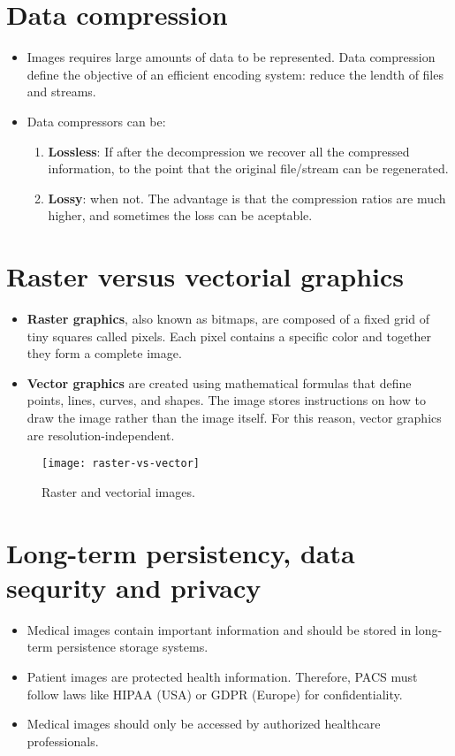 \section{Data compression}
\begin{itemize}
\item Images requires large amounts of data to be represented. Data
compression define the objective of an efficient encoding system:
reduce the lendth of files and streams.
\item Data compressors can be:
\begin{enumerate}
\item \textbf{Lossless}: If after the decompression we recover all the
compressed information, to the point that the original file/stream can
be regenerated.
\item \textbf{Lossy}: when not. The advantage is that the compression
ratios are much higher, and sometimes the loss can be aceptable.
\end{enumerate}
\end{itemize}

\section{Raster versus vectorial graphics}
\begin{itemize}
\item \textbf{Raster graphics}, also known as bitmaps, are composed of
  a fixed grid of tiny squares called pixels. Each pixel contains a
  specific color and together they form a complete image.
\item \textbf{Vector graphics} are created using mathematical formulas
  that define points, lines, curves, and shapes. The image stores
  instructions on how to draw the image rather than the image itself.
  For this reason, vector graphics are resolution-independent.
\end{itemize}
\begin{figure}[H]
  \vspace{-2ex}
  \centering
  \texttt{[image: raster-vs-vector]}
  \caption{Raster and vectorial images.}
  \label{fig:raster_vs_vector}
\end{figure}

\section{Long-term persistency, data sequrity and privacy}
\begin{itemize}
\item Medical images contain important information and should be
  stored in long-term persistence storage systems.
\item Patient images are protected health information. Therefore,
  \gls{PACS} must follow laws like HIPAA (USA) or GDPR (Europe) for
  confidentiality.
\item Medical images should only be accessed by authorized healthcare
  professionals.
\end{itemize}
